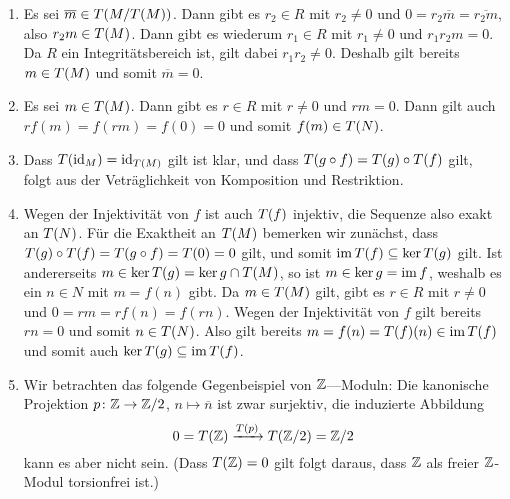 \begin{solution}
\begin{enumerate}
    \item
      Es sei $\overline{m} \in T(M/T(M))$.
      Dann gibt es $r_2 \in R$ mit $r_2 \neq 0$ und $0 = r_2 \overline{m} = \overline{r_2 m}$, also $r_2 m \in T(M)$.
      Dann gibt es wiederum $r_1 \in R$ mit $r_1 \neq 0$ und $r_1 r_2 m = 0$. 
      Da $R$ ein Integritätsbereich ist, gilt dabei $r_1 r_2 \neq 0$.
      Deshalb gilt bereits $m \in T(M)$ und somit $\overline{m} = 0$.
      
    \item
      Es sei $m \in T(M)$.
      Dann gibt es $r \in R$ mit $r \neq 0$ und $rm = 0$.
      Dann gilt auch $r f(m) = f(rm) = f(0) = 0$ und somit $f(m) \in T(N)$.
    
    \item
      Dass $T(\operatorname{id}_M) = \operatorname{id}_{T(M)}$ gilt ist klar, und dass $T(g \circ f) = T(g) \circ T(f)$ gilt, folgt aus der Veträglichkeit von Komposition und Restriktion.
    
    \item
      Wegen der Injektivität von $f$ ist auch $T(f)$ injektiv, die Sequenze also exakt an $T(N)$.
      Für die Exaktheit an $T(M)$ bemerken wir zunächst, dass $T(g) \circ T(f) = T(g \circ f) = T(0) = 0$ gilt, und somit $\operatorname{im} T(f) \subseteq \ker T(g)$ gilt.
      Ist andererseits $m \in \ker T(g) = \ker g \cap T(M)$, so ist $m \in \ker g = \operatorname{im} f$, weshalb es ein $n \in N$ mit $m = f(n)$ gibt.
      Da $m \in T(M)$ gilt, gibt es $r \in R$ mit $r \neq 0$ und $0 = rm = r f(n) = f(rn)$.
      Wegen der Injektivität von $f$ gilt bereits $rn = 0$ und somit $n \in T(N)$.
      Also gilt bereits $m = f(n) = T(f)(n) \in \operatorname{im} T(f)$ und somit auch $\ker T(g) \subseteq \operatorname{im} T(f)$.
    
    \item
      Wir betrachten das folgende Gegenbeispiel von $\mathbb{Z}$—Moduln:
      Die kanonische Projektion $p \colon \mathbb{Z} \to \mathbb{Z}/2$, $n \mapsto \overline{n}$ ist zwar surjektiv, die induzierte Abbildung
      \[
                                  0
        =                         T(\mathbb{Z})
        \xrightarrow{T(p)} T(\mathbb{Z}/2)
        =                         \mathbb{Z}/2
      \]
      kann es aber nicht sein. (Dass $T(\mathbb{Z}) = 0$ gilt folgt daraus, dass $\mathbb{Z}$ als freier $\mathbb{Z}$-Modul torsionfrei ist.)
  \end{enumerate}
\end{solution}


